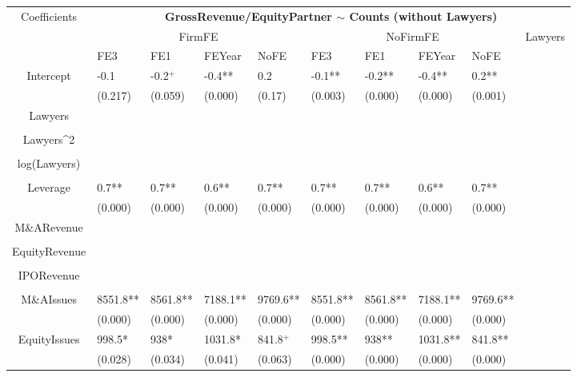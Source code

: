 \documentclass{article}
\begin{document}
\begin{table}[H]
\centering
\begin{tabular}{|clllllllll|}
\hline
\multirow{3}{*}{Coefficients} & \multicolumn{9}{c|}{\textbf{GrossRevenue/EquityPartner $\sim$ Counts (without Lawyers)}} \\
\cline{2-10}
& \multicolumn{4}{c}{FirmFE} & \multicolumn{4}{c}{NoFirmFE} & \multirow{2}{*}{Lawyers} \\
\cline{2-9}
& FE3 & FE1 & FEYear & NoFE & FE3 & FE1 & FEYear & NoFE &  \\
\hline
 
Intercept & -0.1 & -0.2$^{+}$ & -0.4** & 0.2 & -0.1** & -0.2** & -0.4** & 0.2** & \\ 
   & (0.217) & (0.059) & (0.000) & (0.17) & (0.003) & (0.000) & (0.000) & (0.001) & \\ 
  Lawyers &  &  &  &  &  &  &  &  & \\ 
   &  &  &  &  &  &  &  &  & \\ 
  Lawyers^2 &  &  &  &  &  &  &  &  & \\ 
   &  &  &  &  &  &  &  &  & \\ 
  log(Lawyers) &  &  &  &  &  &  &  &  & \\ 
   &  &  &  &  &  &  &  &  & \\ 
  Leverage & 0.7** & 0.7** & 0.6** & 0.7** & 0.7** & 0.7** & 0.6** & 0.7** & \\ 
   & (0.000) & (0.000) & (0.000) & (0.000) & (0.000) & (0.000) & (0.000) & (0.000) & \\ 
  M\&ARevenue &  &  &  &  &  &  &  &  & \\ 
   &  &  &  &  &  &  &  &  & \\ 
  EquityRevenue &  &  &  &  &  &  &  &  & \\ 
   &  &  &  &  &  &  &  &  & \\ 
  IPORevenue &  &  &  &  &  &  &  &  & \\ 
   &  &  &  &  &  &  &  &  & \\ 
  M\&AIssues & 8551.8** & 8561.8** & 7188.1** & 9769.6** & 8551.8** & 8561.8** & 7188.1** & 9769.6** & \\ 
   & (0.000) & (0.000) & (0.000) & (0.000) & (0.000) & (0.000) & (0.000) & (0.000) & \\ 
  EquityIssues & 998.5* & 938* & 1031.8* & 841.8$^{+}$ & 998.5** & 938** & 1031.8** & 841.8** & \\ 
   & (0.028) & (0.034) & (0.041) & (0.063) & (0.000) & (0.000) & (0.000) & (0.000) & \\ 

\end{tabular}
\end{table}
\end{document}
